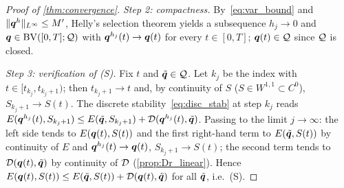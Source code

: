 \begin{proof}[Proof of \cref{thm:convergence}]
\emph{Step 2: compactness.} By~\eqref{eq:var_bound} and
$\|\bm{q}^h\|_{L^\infty}\le M'$, Helly's selection theorem
\cite[Thm.~3.3]{AmbrosioFuscoPallara} yields a subsequence $h_j\to0$ and
$\bm{q}\in\mathrm{BV}([0,T];\mathcal{Q})$ with $\bm{q}^{h_j}(t)\to\bm{q}(t)$ for
every $t\in[0,T]$; $\bm{q}(t)\in\mathcal{Q}$ since $\mathcal{Q}$ is closed.

\emph{Step 3: verification of \textnormal{(S)}.} Fix $t$ and
$\tilde{\bm{q}}\in\mathcal{Q}$. Let $k_j$ be the index with $t\in[t_{k_j},t_{k_j+1})$;
then $t_{k_j+1}\to t$ and, by continuity of $S$ ($S\in W^{1,1}\subset C^0$),
$S_{k_j+1}\to S(t)$. The discrete stability~\eqref{eq:disc_stab} at step
$k_j$ reads
$E(\bm{q}^{h_j}(t),S_{k_j+1})\le E(\tilde{\bm{q}},S_{k_j+1})+\mathcal{D}(\bm{q}^{h_j}(t),\tilde{\bm{q}})$.
Passing to the limit $j\to\infty$: the left side tends to
$E(\bm{q}(t),S(t))$ and the first right-hand term to
$E(\tilde{\bm{q}},S(t))$ by continuity of $E$ and $\bm{q}^{h_j}(t)\to\bm{q}(t)$,
$S_{k_j+1}\to S(t)$; the second term tends to $\mathcal{D}(\bm{q}(t),\tilde{\bm{q}})$
by continuity of $\mathcal{D}$ (\cref{prop:Dr_linear}). Hence
$E(\bm{q}(t),S(t))\le E(\tilde{\bm{q}},S(t))+\mathcal{D}(\bm{q}(t),\tilde{\bm{q}})$
for all $\tilde{\bm{q}}$, i.e.\ (S).


\end{proof}
